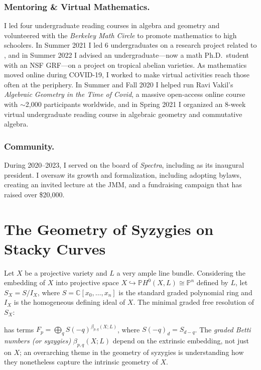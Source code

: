 \documentclass[11pt,reqno]{amsart}
\theoremstyle{remark}
\newcommand{\CC}{\mathbb{C}}
\newcommand{\PP}{\mathbb{P}}
\begin{document}
\subsubsection{Mentoring \& Virtual Mathematics.} I led four undergraduate reading courses in algebra and geometry and volunteered with the \textit{Berkeley Math Circle} to promote mathematics to high schoolers. In Summer 2021 I led 6 undergraduates on a research project related to \cite{BBCMMW24}, and in Summer 2022 I advised an undergraduate---now a math Ph.D.\ student with an NSF GRF---on a project on tropical abelian varieties. As mathematics moved online during COVID-19, I worked to make virtual activities reach those often at the periphery. In Summer and Fall 2020 I helped run Ravi Vakil's \textit{Algebraic Geometry in the Time of Covid}, a massive open-access online course with $\sim$2,000 participants worldwide, and in Spring 2021 I organized an 8-week virtual undergraduate reading course in algebraic geometry and commutative algebra. 

\subsubsection{Community.}  During 2020--2023, I served on the board of \textit{Spectra}, including as its inaugural president. I oversaw its growth and formalization, including adopting bylaws, creating an invited lecture at the JMM, and a fundraising campaign that has raised over \$20,000.

\section{The Geometry of Syzygies on Stacky Curves}\label{sec:syzygies-on-stacks}

Let $X$ be a projective variety and $L$ a very ample line bundle. Considering the embedding of $X$ into projective space $X \hookrightarrow \PP H^{0}(X,L)\cong \PP^{n}$ defined by $L$, let $S_{X}=S/I_{X}$, where $S=\CC[x_{0},\ldots,x_{n}]$ is the standard graded polynomial ring and $I_{X}$ is the homogeneous defining ideal of $X$. The minimal graded free resolution of $S_{X}$:
\begin{center}
\end{center}
has terms $F_p=\bigoplus_q S(-q)^{\beta_{p,q}(X;L)}$, where $S(-q)_d=S_{d-q}$. The \emph{graded Betti numbers (or syzygies)} $\beta_{p,q}(X;L)$ depend on the extrinsic embedding, not just on $X$; an overarching theme in the geometry of syzygies is understanding how they nonetheless capture the intrinsic geometry of $X$.
\end{document}
